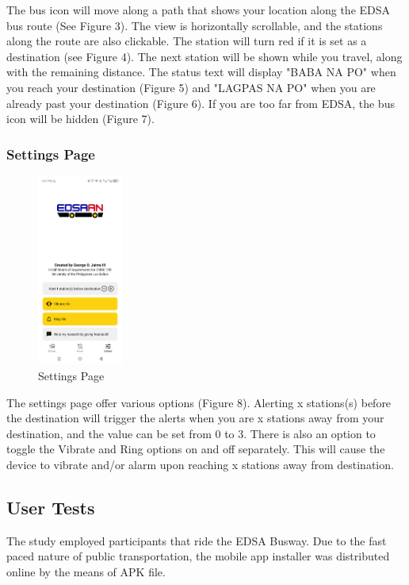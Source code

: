 \documentclass{icsthesis}
\begin{document}
\begin{mainmatter}
The bus icon will move along a path that shows your location along the EDSA bus route (See Figure 3). The view is horizontally scrollable, and the stations along the route are also clickable. The station will turn red if it is set as a destination (see Figure 4). The next station will be shown while you travel, along with the remaining distance. The status text will display "BABA NA PO" when you reach your destination (Figure 5) and "LAGPAS NA PO" when you are already past your destination (Figure 6). If you are too far from EDSA, the bus icon will be hidden (Figure 7).

\subsubsection{\textbf{Settings Page}}

\begin{figure}[htbp]
  \centering
  \includegraphics[width=0.25\textwidth]{Texfiles/screenshots/EDSAan_settings.png}
  \caption{Settings Page}
  \label{fig:yourlabel}
\end{figure}

The settings page offer various options (Figure 8). Alerting x stations(s) before the destination will trigger the alerts when you are x stations away from your destination, and the value can be set from 0 to 3. There is also an option to toggle the Vibrate and Ring options on and off separately. This will cause the device to vibrate and/or alarm upon reaching x stations away from destination.

\subsection{User Tests}
The study employed participants that ride the EDSA Busway. Due to the fast paced nature of public transportation, the mobile app installer was distributed online by the means of APK file.


\end{mainmatter}
\end{document}
